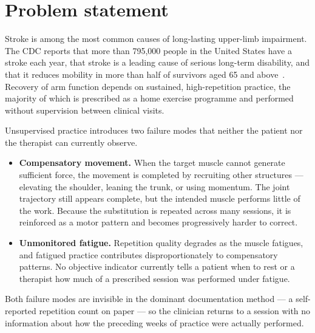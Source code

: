 \documentclass[11pt]{article}
\begin{document}
\section{Problem statement}

Stroke is among the most common causes of long-lasting upper-limb impairment.
The CDC reports that more than 795{,}000 people in the United States have a
stroke each year, that stroke is a leading cause of serious long-term
disability, and that it reduces mobility in more than half of survivors aged 65
and above~\cite{cdc}. Recovery of arm function depends on sustained,
high-repetition practice, the majority of which is prescribed as a home exercise
programme and performed without supervision between clinical visits.

Unsupervised practice introduces two failure modes that neither the patient nor
the therapist can currently observe.

\begin{itemize}
\item \textbf{Compensatory movement.} When the target muscle cannot generate
sufficient force, the movement is completed by recruiting other structures ---
elevating the shoulder, leaning the trunk, or using momentum. The joint
trajectory still appears complete, but the intended muscle performs little of
the work. Because the substitution is repeated across many sessions, it is
reinforced as a motor pattern and becomes progressively harder to correct.
\item \textbf{Unmonitored fatigue.} Repetition quality degrades as the muscle
fatigues, and fatigued practice contributes disproportionately to compensatory
patterns. No objective indicator currently tells a patient when to rest or a
therapist how much of a prescribed session was performed under fatigue.
\end{itemize}

Both failure modes are invisible in the dominant documentation method --- a
self-reported repetition count on paper --- so the clinician returns to a session
with no information about how the preceding weeks of practice were actually
performed.
\end{document}
